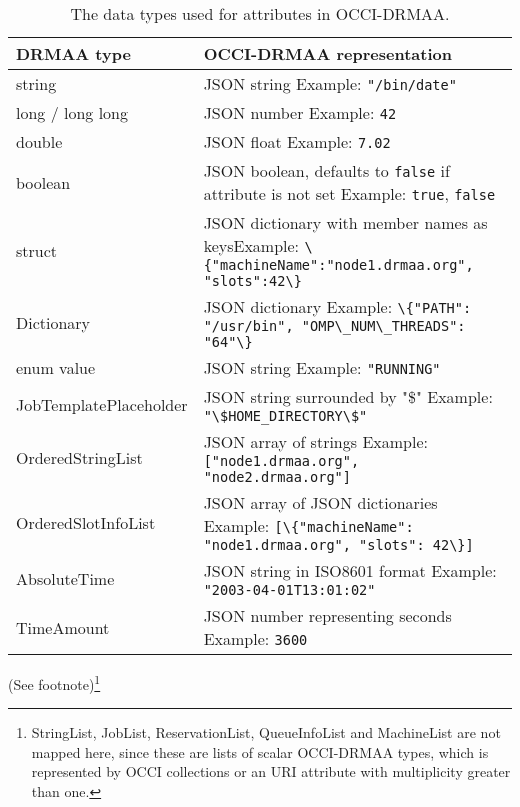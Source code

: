 \documentclass[10pt]{article}
\newcommand{\h}[1]{\lstinline|#1|}
\newcommand{\rat}[1]{ {\tiny(See footnote)}\footnote{#1} }
\begin{document}
\begin{table}[ht]
\centering
\begin{tabularx}{\textwidth}{|l|>{\raggedright\arraybackslash}X|}
\hline
DRMAA type & OCCI-DRMAA representation\\
\hline
string                 & JSON string \linebreak Example: \h{"/bin/date"} \\
long / long long       & JSON number \linebreak Example: \h{42} \\
double                 & JSON float  \linebreak Example: \h{7.02} \\
boolean                & JSON boolean, defaults to \h{false} if attribute is not set \linebreak Example:  \h{true}, \h{false} \\
struct                 & JSON dictionary with member names as keys\linebreak Example:  \h{\{"machineName":"node1.drmaa.org", "slots":42\}} \\
Dictionary             & JSON dictionary \linebreak Example:  \h{\{"PATH": "/usr/bin", "OMP\_NUM\_THREADS": "64"\}} \\
enum value             & JSON string \linebreak Example:  \h{"RUNNING"} \\
JobTemplatePlaceholder & JSON string surrounded by "\$" \linebreak Example: \h{"\$HOME_DIRECTORY\$"} \\ 
OrderedStringList      & JSON array of strings \linebreak Example:  \h{["node1.drmaa.org", "node2.drmaa.org"]} \\
OrderedSlotInfoList    & JSON array of JSON dictionaries \linebreak Example:  \h{[\{"machineName": "node1.drmaa.org", "slots": 42\}]} \\
AbsoluteTime           & JSON string in ISO8601 format \linebreak Example:  \h{"2003-04-01T13:01:02"} \\
TimeAmount             & JSON number representing seconds \linebreak Example:  \h{3600} \\
\hline
\end{tabularx}
\caption{The data types used for attributes in OCCI-DRMAA.}
\label{tab:datatypes}
\rat{StringList, JobList, ReservationList, QueueInfoList and MachineList are not mapped here, since these are lists of scalar OCCI-DRMAA types, which is represented by OCCI collections or an URI attribute with multiplicity greater than one.}
\end{table}
\end{document}
